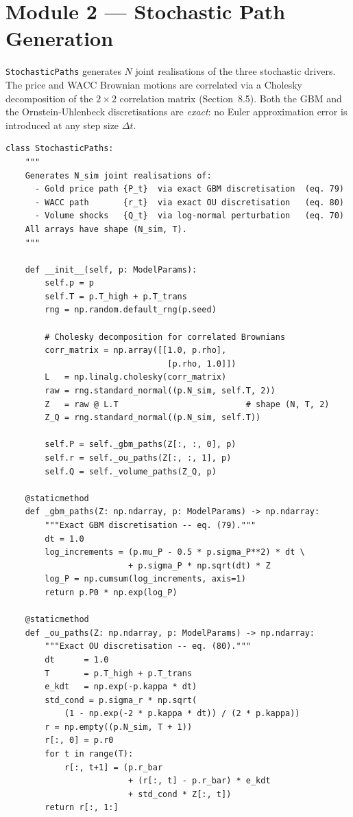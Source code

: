 \section*{Module 2 — Stochastic Path Generation}

\texttt{StochasticPaths} generates $N$ joint realisations of the
three stochastic drivers. The price and WACC Brownian motions are
correlated via a Cholesky decomposition of the $2\times 2$
correlation matrix (Section~8.5). Both the GBM and the
Ornstein-Uhlenbeck discretisations are \emph{exact}: no Euler
approximation error is introduced at any step size $\Delta t$.

\begin{lstlisting}[style=python, caption={StochasticPaths — exact GBM and OU discretisations}]
class StochasticPaths:
    """
    Generates N_sim joint realisations of:
      - Gold price path {P_t}  via exact GBM discretisation  (eq. 79)
      - WACC path       {r_t}  via exact OU discretisation   (eq. 80)
      - Volume shocks   {Q_t}  via log-normal perturbation   (eq. 70)
    All arrays have shape (N_sim, T).
    """

    def __init__(self, p: ModelParams):
        self.p = p
        self.T = p.T_high + p.T_trans
        rng = np.random.default_rng(p.seed)

        # Cholesky decomposition for correlated Brownians
        corr_matrix = np.array([[1.0, p.rho],
                                 [p.rho, 1.0]])
        L   = np.linalg.cholesky(corr_matrix)
        raw = rng.standard_normal((p.N_sim, self.T, 2))
        Z   = raw @ L.T                          # shape (N, T, 2)
        Z_Q = rng.standard_normal((p.N_sim, self.T))

        self.P = self._gbm_paths(Z[:, :, 0], p)
        self.r = self._ou_paths(Z[:, :, 1], p)
        self.Q = self._volume_paths(Z_Q, p)

    @staticmethod
    def _gbm_paths(Z: np.ndarray, p: ModelParams) -> np.ndarray:
        """Exact GBM discretisation -- eq. (79)."""
        dt = 1.0
        log_increments = (p.mu_P - 0.5 * p.sigma_P**2) * dt \
                         + p.sigma_P * np.sqrt(dt) * Z
        log_P = np.cumsum(log_increments, axis=1)
        return p.P0 * np.exp(log_P)

    @staticmethod
    def _ou_paths(Z: np.ndarray, p: ModelParams) -> np.ndarray:
        """Exact OU discretisation -- eq. (80)."""
        dt      = 1.0
        T       = p.T_high + p.T_trans
        e_kdt   = np.exp(-p.kappa * dt)
        std_cond = p.sigma_r * np.sqrt(
            (1 - np.exp(-2 * p.kappa * dt)) / (2 * p.kappa))
        r = np.empty((p.N_sim, T + 1))
        r[:, 0] = p.r0
        for t in range(T):
            r[:, t+1] = (p.r_bar
                         + (r[:, t] - p.r_bar) * e_kdt
                         + std_cond * Z[:, t])
        return r[:, 1:]


\end{lstlisting}
